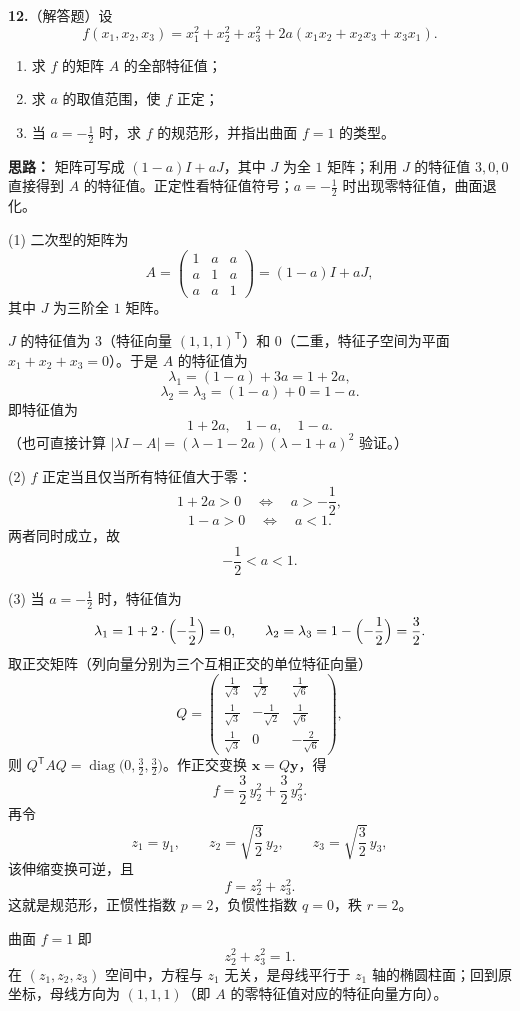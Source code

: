 \textbf{12.}（解答题）设
\[
f(x_1,x_2,x_3)=x_1^2+x_2^2+x_3^2+2a(x_1x_2+x_2x_3+x_3x_1).
\]
\begin{enumerate}
  \item 求 \(f\) 的矩阵 \(A\) 的全部特征值；
  \item 求 \(a\) 的取值范围，使 \(f\) 正定；
  \item 当 \(a=-\frac12\) 时，求 \(f\) 的规范形，并指出曲面 \(f=1\) 的类型。
\end{enumerate}

\ifshowsolutions%

\textbf{思路：} 矩阵可写成 \((1-a)I+aJ\)，其中 \(J\) 为全 \(1\) 矩阵；利用 \(J\) 的特征值 \(3,0,0\) 直接得到 \(A\) 的特征值。正定性看特征值符号；\(a=-\frac12\) 时出现零特征值，曲面退化。

(1) 二次型的矩阵为
\[
A=\begin{pmatrix}
1&a&a\\
a&1&a\\
a&a&1
\end{pmatrix}
=(1-a)I+aJ,
\]
其中 \(J\) 为三阶全 \(1\) 矩阵。

\(J\) 的特征值为 \(3\)（特征向量 \((1,1,1)^{\mathsf T}\)）和 \(0\)（二重，特征子空间为平面 \(x_1+x_2+x_3=0\)）。于是 \(A\) 的特征值为
\[
\lambda_1=(1-a)+3a=1+2a,
\]
\[
\lambda_2=\lambda_3=(1-a)+0=1-a.
\]
即特征值为
\[
1+2a,\quad 1-a,\quad 1-a.
\]
（也可直接计算 \(|\lambda I-A|=(\lambda-1-2a)(\lambda-1+a)^2\) 验证。）

(2) \(f\) 正定当且仅当所有特征值大于零：
\[
1+2a>0\quad\Longleftrightarrow\quad a>-\frac12,
\]
\[
1-a>0\quad\Longleftrightarrow\quad a<1.
\]
两者同时成立，故
\[
-\frac12<a<1.
\]

(3) 当 \(a=-\frac12\) 时，特征值为
\[
\lambda_1=1+2\cdot\Bigl(-\frac12\Bigr)=0,\qquad
\lambda_2=\lambda_3=1-\Bigl(-\frac12\Bigr)=\frac32.
\]
取正交矩阵（列向量分别为三个互相正交的单位特征向量）
\[
Q=\begin{pmatrix}
\frac1{\sqrt3}&\frac1{\sqrt2}&\frac1{\sqrt6}\\[2pt]
\frac1{\sqrt3}&-\frac1{\sqrt2}&\frac1{\sqrt6}\\[2pt]
\frac1{\sqrt3}&0&-\frac2{\sqrt6}
\end{pmatrix},
\]
则 \(Q^{\mathsf T}AQ=\operatorname{diag}\bigl(0,\frac32,\frac32\bigr)\)。作正交变换 \(\mathbf{x}=Q\mathbf{y}\)，得
\[
f=\frac32\,y_2^2+\frac32\,y_3^2.
\]
再令
\[
z_1=y_1,\qquad z_2=\sqrt{\frac32}\,y_2,\qquad z_3=\sqrt{\frac32}\,y_3,
\]
该伸缩变换可逆，且
\[
f=z_2^2+z_3^2.
\]
这就是规范形，正惯性指数 \(p=2\)，负惯性指数 \(q=0\)，秩 \(r=2\)。

曲面 \(f=1\) 即
\[
z_2^2+z_3^2=1.
\]
在 \((z_1,z_2,z_3)\) 空间中，方程与 \(z_1\) 无关，是母线平行于 \(z_1\) 轴的椭圆柱面；回到原坐标，母线方向为 \((1,1,1)\)（即 \(A\) 的零特征值对应的特征向量方向）。

\else \answerarea[14] \fi%
